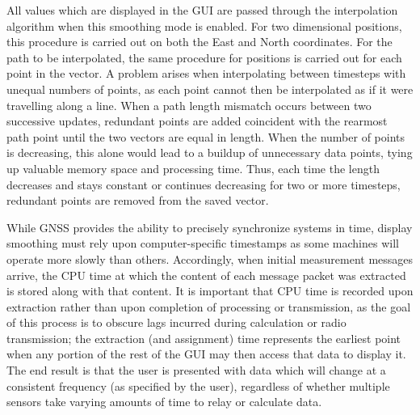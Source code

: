 \documentclass[twocolumn,10pt]{article}
\begin{document}
    All values which are displayed in the GUI are passed through the interpolation algorithm when this smoothing mode is enabled.
    For two dimensional positions, this procedure is carried out on both the East and North coordinates. 
    For the path to be interpolated,  the same procedure for positions is carried out for each point in the vector. A problem arises when interpolating between timesteps with unequal numbers of points, as each point cannot then be interpolated as if it were travelling along a line. When a path length mismatch occurs between two successive updates, redundant points are added coincident with the rearmost path point until the two vectors are equal in length. When the number of points is decreasing, this alone would lead to a buildup of unnecessary data points, tying up valuable memory space and processing time. Thus, each time the length decreases and stays constant or continues decreasing for two or more timesteps, redundant points are removed from the saved vector.

    While GNSS provides the ability to precisely synchronize systems in time, display smoothing must rely upon computer-specific timestamps as some machines will operate more slowly than others. Accordingly, when initial measurement messages arrive, the CPU time at which the content of each message packet was extracted is stored along with that content. It is important that CPU time is recorded upon extraction rather than upon completion of processing or transmission, as the goal of this process is to obscure lags incurred during calculation or radio transmission; the extraction (and assignment) time represents the earliest point when any portion of the rest of the GUI may then access that data to display it. The end result is that the user is presented with data which will change at a consistent frequency (as specified by the user), regardless of whether multiple sensors take varying amounts of time to relay or calculate data.


\end{document}
